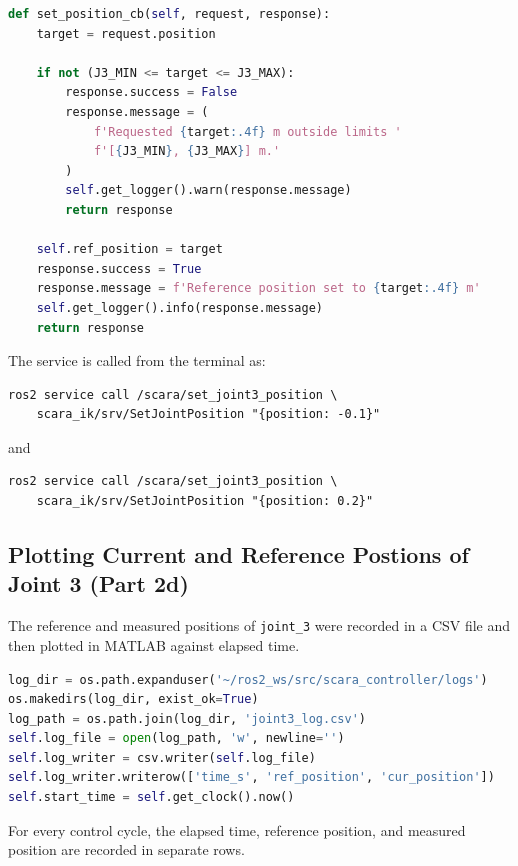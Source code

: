 \documentclass[12pt]{article}
\begin{document}
\begin{lstlisting}[style=ros, language=Python,
    caption={Service callback in \texttt{controller\_node.py}}]
def set_position_cb(self, request, response):
    target = request.position

    if not (J3_MIN <= target <= J3_MAX):
        response.success = False
        response.message = (
            f'Requested {target:.4f} m outside limits '
            f'[{J3_MIN}, {J3_MAX}] m.'
        )
        self.get_logger().warn(response.message)
        return response

    self.ref_position = target
    response.success = True
    response.message = f'Reference position set to {target:.4f} m'
    self.get_logger().info(response.message)
    return response
\end{lstlisting}

The service is called from the terminal as:

\begin{lstlisting}[style=bash]
ros2 service call /scara/set_joint3_position \
    scara_ik/srv/SetJointPosition "{position: -0.1}"
\end{lstlisting}
and
\begin{lstlisting}[style=bash]
ros2 service call /scara/set_joint3_position \
    scara_ik/srv/SetJointPosition "{position: 0.2}"
\end{lstlisting}

\subsection{Plotting Current and Reference Postions of Joint 3 (Part 2d)}

The reference and measured positions of \texttt{joint\_3} were recorded in a CSV file and then plotted in MATLAB against elapsed time.

\begin{lstlisting}[style=ros, language=Python,
    caption={CSV logging setup in \texttt{controller\_node.py}}]
log_dir = os.path.expanduser('~/ros2_ws/src/scara_controller/logs')
os.makedirs(log_dir, exist_ok=True)
log_path = os.path.join(log_dir, 'joint3_log.csv')
self.log_file = open(log_path, 'w', newline='')
self.log_writer = csv.writer(self.log_file)
self.log_writer.writerow(['time_s', 'ref_position', 'cur_position'])
self.start_time = self.get_clock().now()
\end{lstlisting}

For every control cycle, the elapsed time, reference position, and measured position are recorded in separate rows.
\end{document}
